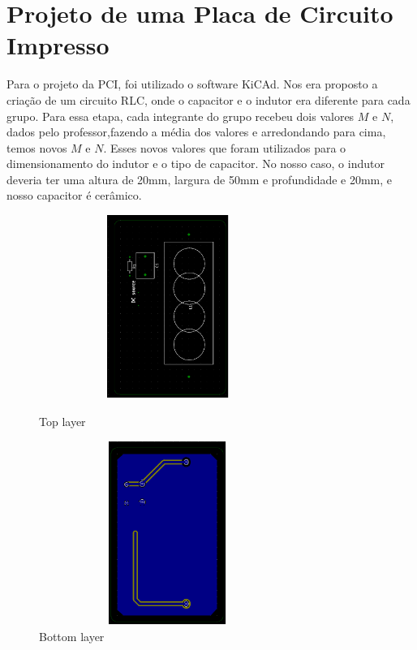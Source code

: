 %
\chapter{Projeto de uma Placa de Circuito Impresso }\label{cap_pcb}

Para o projeto da PCI, foi utilizado o software KiCAd\cite{kicad}. Nos era proposto a criação de um circuito RLC, onde o capacitor e o indutor era diferente para cada grupo. Para essa etapa, cada integrante do grupo recebeu dois valores $M$ e $N$, dados pelo professor,fazendo a média dos valores e arredondando para cima, temos novos $M$ e $N$. Esses novos valores que foram utilizados para o dimensionamento do indutor e o tipo de capacitor. No nosso caso, o indutor deveria ter uma altura de 20mm, largura de 50mm e profundidade e 20mm, e nosso capacitor é cerâmico.

\begin{figure}[!htb]
    \begin{minipage}{0.5\textwidth}
    \centering
    \includegraphics[height = 6cm,width = 0.75\textwidth]{PCB_1.png}
    \caption{Top layer}
    \end{minipage}\hfill
    \begin{minipage}{0.5\textwidth}
    \centering
    \includegraphics[height = 6cm,width = 0.75\textwidth]{PCB_2.png}
    \caption{Bottom layer}
    \end{minipage}\hfill
\end{figure}

